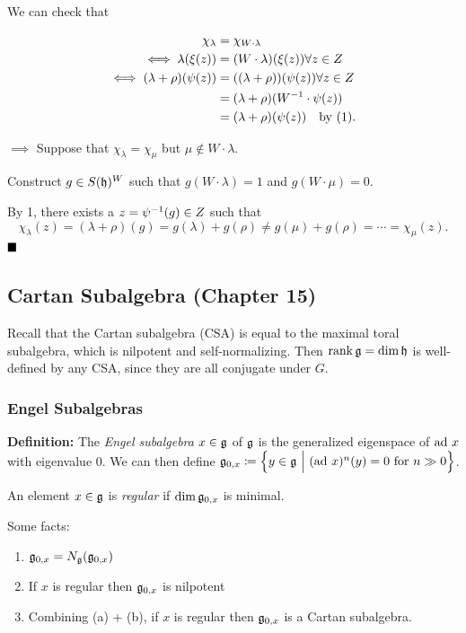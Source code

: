 We can check that

\begin{align*}
\chi_\lambda &= \chi_{W\cdot \lambda} \\
\iff \lambda(\xi(z)) &= (W\cdot \lambda) (\xi(z)) \forall z\in Z \\
\iff (\lambda + \rho)(\psi(z)) &= ((\lambda + \rho))(\psi(z)) \forall z\in Z \\
&= (\lambda + \rho)(W^{-1} \cdot \psi(z)) \\
&= (\lambda + \rho)(\psi(z)) \quad \text{by (1)}
.\end{align*}

\(\implies\) Suppose that \(\chi_\lambda = \chi_\mu\) but
\(\mu \not\in W\cdot \lambda\).

Construct \(g \in S({\mathfrak{h}})^W\) such that \(g(W\cdot \lambda) = 1\) and
\(g(W\cdot \mu) = 0\).

By 1, there exists a \(z = \psi^{-1}(g) \in Z\) such that \[
\chi_\lambda(z) = (\lambda + \rho) (g) = g(\lambda) + g(\rho) \neq g(\mu) + g(\rho) = \cdots = \chi_\mu(z).
\] \(\qed\)

\hypertarget{cartan-subalgebra-chapter-15}{%
\subsection{Cartan Subalgebra (Chapter
15)}\label{cartan-subalgebra-chapter-15}}

Recall that the Cartan subalgebra (CSA) is equal to the maximal toral
subalgebra, which is nilpotent and self-normalizing. Then
\(\operatorname{rank} {\mathfrak{g}} = \dim {\mathfrak{h}}\) is well-defined by any CSA, since they are
all conjugate under \(G\).

\hypertarget{engel-subalgebras}{%
\subsubsection{Engel Subalgebras}\label{engel-subalgebras}}

\textbf{Definition:} The \emph{Engel subalgebra} \(x\in {\mathfrak{g}}\) of
\({\mathfrak{g}}\) is the generalized eigenspace of \(\mathrm{ad}~ x\) with eigenvalue 0.
We can then define
\({\mathfrak{g}}_{0, x} \coloneqq \left\{{y\in{\mathfrak{g}} {~\mathrel{\Big|}~} (\mathrm{ad}~ x)^n (y) = 0 \text{ for } n \gg 0}\right\}\).

An element \(x\in{\mathfrak{g}}\) is \emph{regular} if \(\dim {\mathfrak{g}}_{0, x}\) is
minimal.

Some facts:

\begin{enumerate}
\def\labelenumi{\alph{enumi}.}
\tightlist
\item
  \({\mathfrak{g}}_{0, x} = N_{\mathfrak{g}}({\mathfrak{g}}_{0, x})\)
\item
  If \(x\) is regular then \({\mathfrak{g}}_{0, x}\) is nilpotent
\item
  Combining (a) + (b), if \(x\) is regular then \({\mathfrak{g}}_{0, x}\) is a
  Cartan subalgebra.
\end{enumerate}

